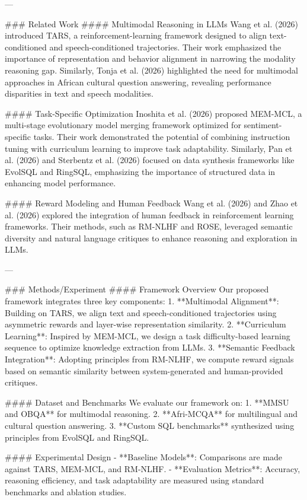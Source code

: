 ---

### Related Work
#### Multimodal Reasoning in LLMs
Wang et al. (2026) introduced TARS, a reinforcement-learning framework designed to align text-conditioned and speech-conditioned trajectories. Their work emphasized the importance of representation and behavior alignment in narrowing the modality reasoning gap. Similarly, Tonja et al. (2026) highlighted the need for multimodal approaches in African cultural question answering, revealing performance disparities in text and speech modalities.

#### Task-Specific Optimization
Inoshita et al. (2026) proposed MEM-MCL, a multi-stage evolutionary model merging framework optimized for sentiment-specific tasks. Their work demonstrated the potential of combining instruction tuning with curriculum learning to improve task adaptability. Similarly, Pan et al. (2026) and Sterbentz et al. (2026) focused on data synthesis frameworks like EvolSQL and RingSQL, emphasizing the importance of structured data in enhancing model performance.

#### Reward Modeling and Human Feedback
Wang et al. (2026) and Zhao et al. (2026) explored the integration of human feedback in reinforcement learning frameworks. Their methods, such as RM-NLHF and ROSE, leveraged semantic diversity and natural language critiques to enhance reasoning and exploration in LLMs.

---

### Methods/Experiment
#### Framework Overview
Our proposed framework integrates three key components: 
1. **Multimodal Alignment**: Building on TARS, we align text and speech-conditioned trajectories using asymmetric rewards and layer-wise representation similarity.
2. **Curriculum Learning**: Inspired by MEM-MCL, we design a task difficulty-based learning sequence to optimize knowledge extraction from LLMs.
3. **Semantic Feedback Integration**: Adopting principles from RM-NLHF, we compute reward signals based on semantic similarity between system-generated and human-provided critiques.

#### Dataset and Benchmarks
We evaluate our framework on:
1. **MMSU and OBQA** for multimodal reasoning.
2. **Afri-MCQA** for multilingual and cultural question answering.
3. **Custom SQL benchmarks** synthesized using principles from EvolSQL and RingSQL.

#### Experimental Design
- **Baseline Models**: Comparisons are made against TARS, MEM-MCL, and RM-NLHF.
- **Evaluation Metrics**: Accuracy, reasoning efficiency, and task adaptability are measured using standard benchmarks and ablation studies.

